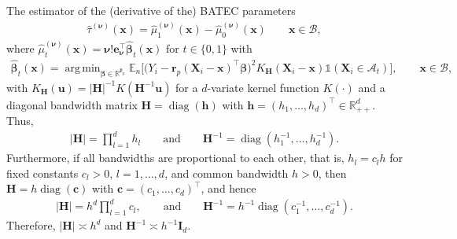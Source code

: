 \documentclass[10pt]{article}
\DeclareMathOperator*{\argmin}{arg\,min}
\DeclareMathOperator*{\diag}{diag}
\newcommand{\Indicator}{\mathds{1}}
\newcommand{\En}{\mathbb{E}_n}
\newcommand{\bc}{\mathbf{c}}
\newcommand{\be}{\mathbf{e}}
\newcommand{\bh}{\mathbf{h}}
\newcommand{\bH}{\mathbf{H}}
\newcommand{\bI}{\mathbf{I}}
\newcommand{\br}{\mathbf{r}}
\newcommand{\bu}{\mathbf{u}}
\newcommand{\bx}{\mathbf{x}}
\newcommand{\bX}{\mathbf{X}}
\newcommand{\bbeta}{\boldsymbol{\beta}}
\newcommand{\bnu}{\boldsymbol{\nu}}
\newcommand{\A}{\mathcal{A}}
\newcommand{\B}{\mathcal{B}}
\begin{document}
The estimator of the (derivative of the) BATEC parameters
\begin{align*}
    \widehat{\tau}^{(\bnu)}(\bx)
    = \widehat{\mu}^{(\bnu)}_1(\bx) - \widehat{\mu}^{(\bnu)}_0(\bx)
    \qquad \bx\in\B,
\end{align*}
where $\widehat{\mu}_t^{(\bnu)}(\bx) = \bnu! \be_{\bnu}^\top \widehat{\bbeta}_t(\bx)$ for $t\in\{0,1\}$ with
\begin{align}\label{sa-eq: locpoly estimator}
    \widehat{\bbeta}_t(\bx)
    = \argmin_{\bbeta \in \mathbb{R}^{\mathfrak{p}_p}}
      \En \big[ \big(Y_i - \br_p(\bX_i - \bx)^{\top}\bbeta \big)^2 K_{\bH}(\bX_i - \bx)\Indicator(\bX_i \in \A_t) \big], \qquad \bx \in \B,
\end{align}
with $K_{\bH}(\bu) = |\bH|^{-1} K(\bH^{-1}\bu)$ for a $d$-variate kernel function $K(\cdot)$ and a diagonal bandwidth matrix $\bH = \diag(\bh)$ with $\bh = (h_1, \ldots, h_d)^\top\in\mathbb{R}^d_{++}$. Thus,
\begin{align*}
    |\bH| = \prod_{l = 1}^d h_l
    \qquad\text{and}\qquad
    \bH^{-1} = \diag(h_1^{-1}, \ldots, h_d^{-1}).
\end{align*}
Furthermore, if all bandwidths are proportional to each other, that is, $h_l = c_l h$ for fixed constants $c_l > 0$, $l=1,\ldots,d$, and common bandwidth $h > 0$, then $\bH = h \diag(\bc)$ with $\bc=(c_1,\ldots,c_d)^\top$, and hence
\begin{align*}
    |\bH| = h^d \prod_{l = 1}^d c_l,
    \qquad\text{and}\qquad
    \bH^{-1} = h^{-1} \diag(c_1^{-1}, \ldots, c_d^{-1}).
\end{align*}
Therefore, $|\bH|\asymp h^d$ and $\bH^{-1} \asymp h^{-1} \bI_d$.
\end{document}
